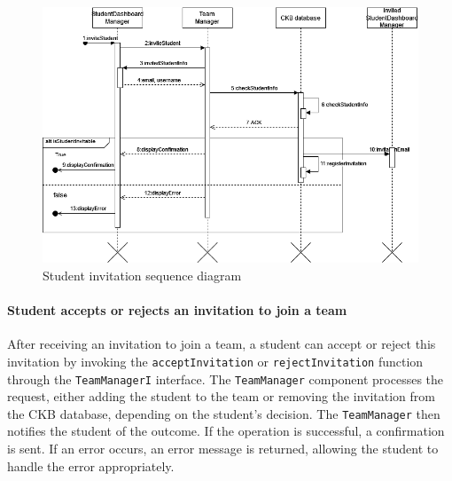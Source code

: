 \begin{figure}[H]
    \begin{center}
        \includegraphics[width=\linewidth]{Images/sequence/Sd_invitation.png}
        \caption{Student invitation sequence diagram}
        \label{fig:student_invite}
    \end{center}
\end{figure}

\paragraph{Student accepts or rejects an invitation to join a team}
After receiving an invitation to join a team, a student can accept or reject this invitation by invoking the \verb|acceptInvitation| or \verb|rejectInvitation| function through the \verb|TeamManagerI| interface. 
The \verb|TeamManager| component processes the request, either adding the student to the team or removing the invitation from the CKB database, depending on the student's decision. 
The \verb|TeamManager| then notifies the student of the outcome. If the operation is successful, a confirmation is sent. If an error occurs, an error message is returned, allowing the student to handle the error appropriately.

